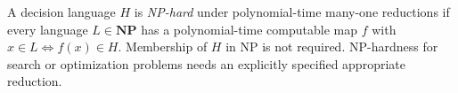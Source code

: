 
A decision language $H$ is \emph{NP-hard} under polynomial-time many-one reductions if every language $L\in\mathbf{NP}$ has a polynomial-time computable map $f$ with $x\in L\iff f(x)\in H$. Membership of $H$ in NP is not required. NP-hardness for search or optimization problems needs an explicitly specified appropriate reduction.
